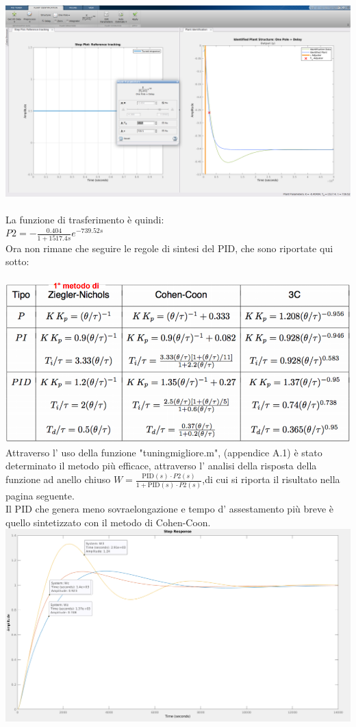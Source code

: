 \documentclass[Lau,noexaminfo]{sapthesis}
\begin{document}
 	\includegraphics[scale=0.32,angle=90]{P2_estimating}\\\\
	La funzione di trasferimento è quindi:\\
	$P2=-\frac{0.404}{1+1517.4s}e^{-739.52s}$\\
	Ora non rimane che seguire le regole di sintesi del PID, che sono riportate qui sotto:\\\\
	\includegraphics[height=0.32\textheight,]{Regole_PID}
	Attraverso l' uso della funzione "tuning\textunderscore migliore.m", (appendice A.1) è stato determinato il metodo più efficace, attraverso l' analisi della risposta della funzione ad anello chiuso $W=\frac{\text{PID}(s)\cdot P2(s)}{1+\text{PID}(s)\cdot P2(s)}$,di cui si riporta il risultato nella pagina seguente.\\
	Il PID che genera meno sovraelongazione e tempo d' assestamento più breve è
	quello sintetizzato con il metodo di Cohen-Coon.\\
	\includegraphics[scale=0.38,angle=90]{step_response_metodi_P2}\\\\
\end{document}
